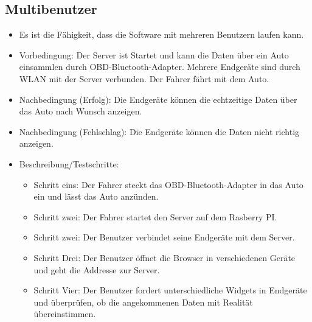 \documentclass[qualitaetssicherung.tex]{subfiles}
\begin{document}
	\subsection{Multibenutzer}
		\begin{itemize}
			\item
			Es ist die Fähigkeit, dass die Software mit mehreren Benutzern laufen kann.
			\item
			Vorbedingung: Der Server ist Startet und kann die Daten über ein Auto
			einsammlen durch OBD-Bluetooth-Adapter. Mehrere Endgeräte sind durch WLAN
			mit der Server verbunden. Der Fahrer fährt mit dem Auto.
			\item
			Nachbedingung (Erfolg): Die Endgeräte können die echtzeitige Daten über das
			Auto nach Wunsch anzeigen.
			\item
			Nachbedingung (Fehlschlag): Die Endgeräte können die Daten nicht richtig
			anzeigen.
			\item
			Beschreibung/Testschritte:
			\begin{itemize}
				\item
				Schritt eins: Der Fahrer steckt das OBD-Bluetooth-Adapter in das Auto
				ein und lässt das Auto anzünden.
				\item
				Schritt zwei: Der Fahrer startet den Server auf dem Rasberry PI.
				\item
				Schritt zwei: Der Benutzer verbindet seine Endgeräte mit dem Server.
				\item 
				Schritt Drei: Der Benutzer öffnet die Browser in verschiedenen Geräte
				und geht die Addresse zur Server.
				\item 
				Schritt Vier: Der Benutzer fordert unterschiedliche Widgets in
				Endgeräte und überprüfen, ob die angekommenen Daten mit Realität
				übereinstimmen.
			\end{itemize}
		\end{itemize}
\end{document}
